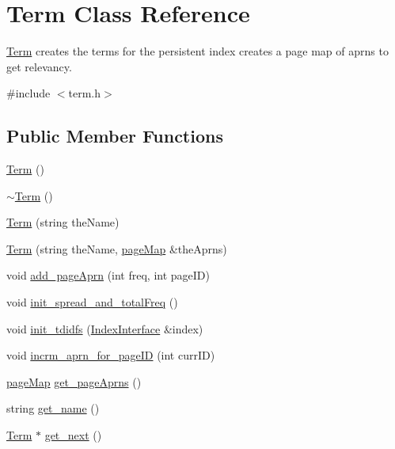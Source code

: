 \hypertarget{class_term}{}\section{Term Class Reference}
\label{class_term}


\hyperlink{class_term}{Term} creates the terms for the persistent index creates a page map of aprns to get relevancy.  




{\ttfamily \#include $<$term.\+h$>$}

\subsection*{Public Member Functions}
\begin{DoxyCompactItemize}
\item 
\hyperlink{class_term_a6943005db5b7e5ca84afcb54a5862d42}{Term} ()
\item 
\hyperlink{class_term_af684aafab11ec6442aed0866b4973afc}{$\sim$\+Term} ()
\item 
\hyperlink{class_term_aa67dd812957ad124bb6306960dd8709c}{Term} (string the\+Name)
\item 
\hyperlink{class_term_ae97a04d16b87ac6bebe1057481f962c8}{Term} (string the\+Name, \hyperlink{avltreeinterface_8h_afdba5c4962a1c0abdda6ca3e414a9a45}{page\+Map} \&the\+Aprns)
\item 
void \hyperlink{class_term_a30b1bfc816bf5a495937476bf56fd567}{add\+\_\+page\+Aprn} (int freq, int page\+I\+D)
\item 
void \hyperlink{class_term_a2cd7415c99700d9b038517207e1d2738}{init\+\_\+spread\+\_\+and\+\_\+total\+Freq} ()
\item 
void \hyperlink{class_term_a3a48a3273c4bb8755c4623efbf3ebf51}{init\+\_\+tdidfs} (\hyperlink{class_index_interface}{Index\+Interface} \&index)
\item 
void \hyperlink{class_term_a40b76759d6a08c027142527f86d85256}{incrm\+\_\+aprn\+\_\+for\+\_\+page\+I\+D} (int curr\+I\+D)
\item 
\hyperlink{avltreeinterface_8h_afdba5c4962a1c0abdda6ca3e414a9a45}{page\+Map} \hyperlink{class_term_a3f33daab2cf50371f191c75656aabb66}{get\+\_\+page\+Aprns} ()
\item 
string \hyperlink{class_term_aba11aacf87334a460aae98148699dc46}{get\+\_\+name} ()
\item 
\hyperlink{class_term}{Term} $\ast$ \hyperlink{class_term_a94ed9995429f2c6fd6d0b9556cc61ff7}{get\+\_\+next} ()
\item 

\end{DoxyCompactItemize}

